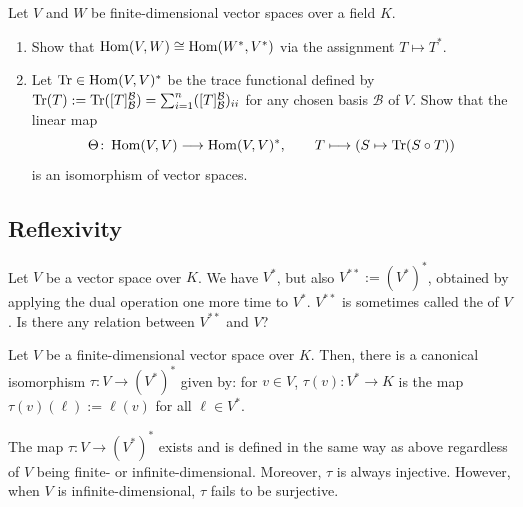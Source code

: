 \begin{exercise}
\label{exc:hom_dual_isomorphism_trace_pairing}
Let $V$ and $W$ be finite-dimensional vector spaces over a field $K$.
\begin{enumerate}[label=\textbf{(\alph*)}]
    \item Show that $\operatorname{Hom}(V, W) \cong \operatorname{Hom}(W^*, V^*)$ via the assignment $T \mapsto T^*$.
    \item Let $\operatorname{Tr} \in \operatorname{Hom}(V, V)^*$ be the trace functional defined by $\operatorname{Tr}(T) := \operatorname{Tr}([T]_{\mathcal{B}}^{\mathcal{B}}) = \sum_{i=1}^n ([T]_{\mathcal{B}}^{\mathcal{B}})_{ii}$ for any chosen basis $\mathcal{B}$ of $V$.
    Show that the linear map
    \[
    \Theta \colon \operatorname{Hom}(V, V) \longrightarrow \operatorname{Hom}(V, V)^*, \qquad T \longmapsto \left( S \mapsto \operatorname{Tr}(S \circ T) \right)
    \]
    is an isomorphism of vector spaces.
\end{enumerate}
\end{exercise}

\subsection{Reflexivity}
Let $V$ be a vector space over $K$. We have $V^*$, but also $V^{**} := (V^*)^*$, obtained by applying the dual operation one more time to $V^*$. $V^{**}$ is sometimes called the  of $V$. Is there any relation between $V^{**}$ and $V$?

\begin{theorem}
\label{thm:natural_map_injective}
  Let $V$ be a finite-di\-men\-sional vector space over $K$. Then, there is a canonical isomorphism $\tau \colon V \to (V^*)^*$ given by: for $v \in V$, $\tau(v) \colon V^* \to K$ is the map $\tau(v)(\ell) := \ell(v)$ for all $\ell \in V^*$.
\end{theorem}

\begin{remark}
  The map $\tau \colon V \to (V^*)^*$ exists and is defined in the same way as above regardless of $V$ being finite- or infinite-dimensional. Moreover, $\tau$ is always injective. However, when $V$ is infinite-dimensional, $\tau$ fails to be surjective.
\end{remark}

